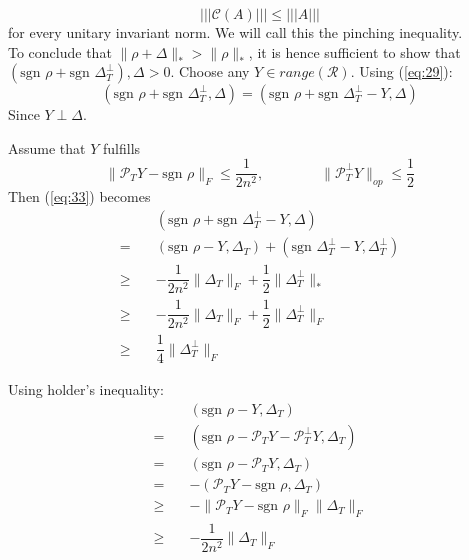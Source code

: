 \documentclass{article}
\begin{document}
{\color{red}
\begin{equation*}
|||\mathcal{C}(A)||| \le |||A|||
\end{equation*}
}
for every unitary invariant norm. We will call this the pinching inequality.
\\[2ex]

To conclude that $\|\rho+\Delta\|_* > \|\rho\|_*$, it is hence sufficient to show that $(\text{sgn }\rho+\text{sgn }\Delta_T^\perp),\Delta>0$. Choose any  $Y \in range(\mathcal{R})$.
Using (\ref{eq:29}):
\begin{equation}
(\text{sgn }\rho+\text{sgn }\Delta_T^\perp,\Delta) = (\text{sgn }\rho+\text{sgn }\Delta_T^\perp-Y,\Delta)
\label{eq:33}
\end{equation}
Since $Y \perp \Delta$.

Assume that $Y$ fulfills
\begin{equation}
\|\mathcal{P}_TY - \text{sgn }\rho\|_F \le \dfrac{1}{2n^2}, \qquad \qquad \|\mathcal{P}_T^\perp Y\|_{op} \le \dfrac{1}{2}
\label{eq:34}
\end{equation}
Then (\ref{eq:33}) becomes
\begin{align*}
& (\text{sgn }\rho+\text{sgn }\Delta_T^\perp-Y,\Delta)\\
= \quad & (\text{sgn }\rho-Y,\Delta_T)+(\text{sgn }\Delta_T^\perp-Y,\Delta_T^\perp)\\
\ge \quad & -\dfrac{1}{2n^2}\|\Delta_T\|_F + \dfrac{1}{2}\|\Delta_T^\perp\|_*\\
\ge \quad & -\dfrac{1}{2n^2}\|\Delta_T\|_F + \dfrac{1}{2}\|\Delta_T^\perp\|_F\\
\ge \quad & \dfrac{1}{4}\|\Delta_T^\perp\|_F
\end{align*}

Using holder's inequality:
\begin{align*}
&(\text{sgn }\rho - Y,\Delta_T)\\
= \quad&(\text{sgn }\rho - \mathcal{P}_TY - \mathcal{P}_T^\perp Y, \Delta_T)\\
= \quad&(\text{sgn }\rho - \mathcal{P}_TY,\Delta_T)\\
=  \quad&- (\mathcal{P}_TY - \text{sgn }\rho, \Delta_T) \\
\ge\quad&-\|\mathcal{P}_TY-\text{sgn }\rho\|_F\|\Delta_T\|_F\\\ge\quad& -\dfrac{1}{2n^2}\|\Delta_T\|_F
\end{align*}
\end{document}

